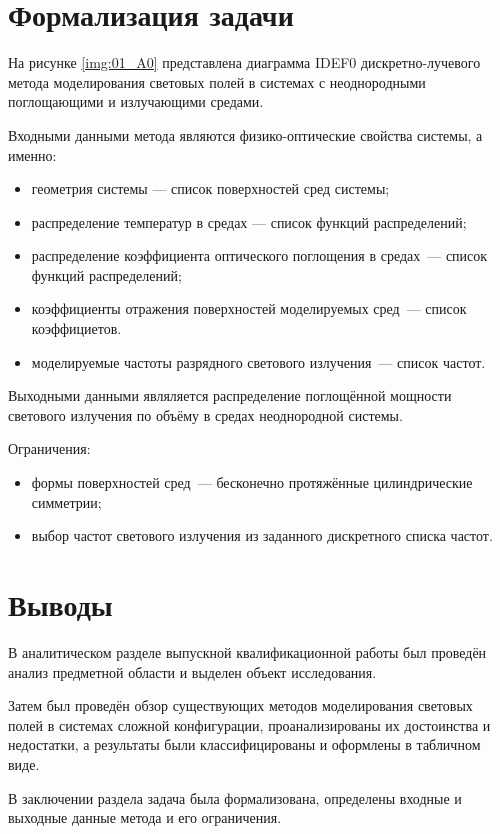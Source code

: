 \section{Формализация задачи}

На рисунке \ref{img:01_A0} представлена диаграмма IDEF0 дискретно-лучевого метода моделирования световых полей в системах с неоднородными поглощающими и излучающими средами.


Входными данными метода являются физико-оптические свойства системы, а именно:
\begin{itemize}
	\item геометрия системы — список поверхностей сред системы;
	\item распределение температур в средах — список функций распределений;
	\item распределение коэффициента оптического поглощения в средах~— список функций распределений;
	\item коэффициенты отражения поверхностей моделируемых сред~— список коэффициетов.
	\item моделируемые частоты разрядного светового излучения~— список частот.
\end{itemize}

Выходными данными являляется распределение поглощённой мощности светового излучения по объёму в средах неоднородной системы.

Ограничения:
\begin{itemize}
	\item формы поверхностей сред~— бесконечно протяжённые цилиндрические симметрии;
	\item выбор частот светового излучения из заданного дискретного списка частот.
\end{itemize}

\section*{Выводы}

В аналитическом разделе выпускной квалификационной работы был проведён анализ предметной области и выделен объект исследования.

Затем был проведён обзор существующих методов моделирования световых полей в системах сложной конфигурации, проанализированы их достоинства и недостатки, а результаты были классифицированы и оформлены в табличном виде.

В заключении раздела задача была формализована, определены входные и выходные данные метода и его ограничения.

\let\wF\relax